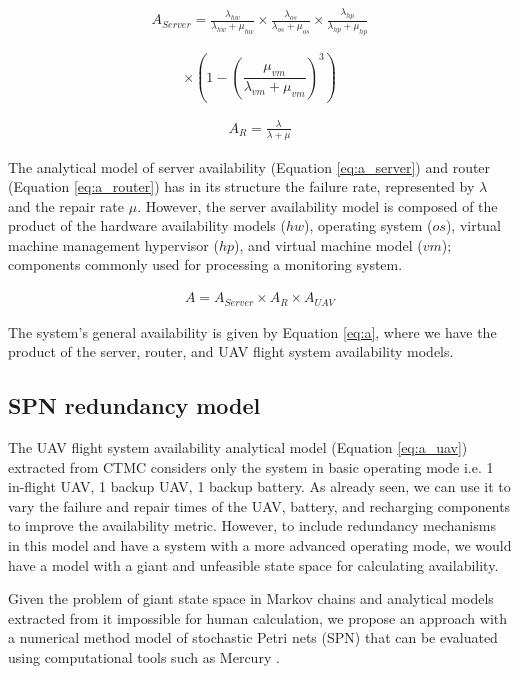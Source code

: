 \documentclass[conference]{IEEEtran}
\begin{document}
\begin{align}\label{eq:a_server}
A_{Server} = \frac{\lambda_{hw}}{\lambda_{hw} + \mu_{hw}} \times \frac{\lambda_{os}}{\lambda_{os} + \mu_{os}} \times
\frac{\lambda_{hp}}{\lambda_{hp} + \mu_{hp}} 
\end{align}

\[\times(1- (\frac{\mu_{vm}}{\lambda_{vm} + \mu_{vm}})^{3})\]

\begin{align}\label{eq:a_router}
A_{R} = \frac{\lambda}{\lambda + \mu} 
\end{align}

The analytical model of server availability (Equation \ref{eq:a_server}) and router (Equation \ref{eq:a_router}) has in its structure the failure rate, represented by $\lambda$ and the repair rate $\mu $. However, the server availability model is composed of the product of the hardware availability models ($hw$), operating system ($os$), virtual machine management hypervisor ($hp$), and virtual machine model ($ vm$); components commonly used for processing a monitoring system.

\begin{align}\label{eq:a}
A = A_{Server} \times A_{R}  \times A_{UAV}
\end{align}

The system's general availability is given by Equation \ref{eq:a}, where we have the product of the server, router, and UAV flight system availability models.

\subsection{SPN redundancy model}

The UAV flight system availability analytical model (Equation \ref{eq:a_uav}) extracted from CTMC considers only the system in basic operating mode i.e. 1 in-flight UAV, 1 backup UAV, 1 backup battery. As already seen, we can use it to vary the failure and repair times of the UAV, battery, and recharging components to improve the availability metric. However, to include redundancy mechanisms in this model and have a system with a more advanced operating mode, we would have a model with a giant and unfeasible state space for calculating availability.

Given the problem of giant state space in Markov chains and analytical models extracted from it impossible for human calculation, we propose an approach with a numerical method model of stochastic Petri nets (SPN) that can be evaluated using computational tools such as Mercury \cite{maciel2017mercury}.
\end{document}
